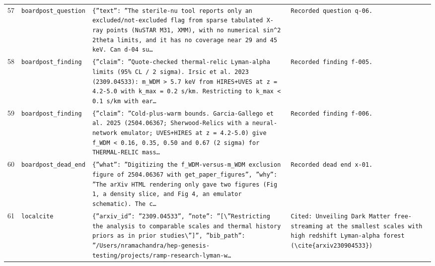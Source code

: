 \documentclass[11pt,a4paper]{article}
\begin{document}
\begin{longtable}{@{}p{}p{}p{}p{}@{}}
57 & \texttt{board}\newline\texttt{post\_\allowbreak{}question} & \texttt{\{''text'':\allowbreak{} ''The sterile-nu tool reports only an excluded/\allowbreak{}not-excluded flag from sparse tabulated X-ray points (NuSTAR M31,\allowbreak{} XMM)\allowbreak{},\allowbreak{} with no numerical sin\textasciicircum{}\allowbreak{}2 2theta limits,\allowbreak{} and it has no coverage near 29 and 45 keV. Can d-04 su\ldots{}\allowbreak{}} & \texttt{Recorded question q-06.} \\
58 & \texttt{board}\newline\texttt{post\_\allowbreak{}finding} & \texttt{\{''claim'':\allowbreak{} ''Quote-checked thermal-relic Lyman-alpha limits (95\% CL /\allowbreak{} 2 sigma)\allowbreak{}. Irsic et al. 2023 (2309.04533)\allowbreak{}:\allowbreak{} m\_\allowbreak{}WDM \textgreater{}\allowbreak{} 5.7 keV from HIRES+UVES at z =\allowbreak{} 4.2-5.0 with k\_\allowbreak{}max =\allowbreak{} 0.2 s/\allowbreak{}km. Restricting to k\_\allowbreak{}max \textless{}\allowbreak{} 0.1 s/\allowbreak{}km with ear\ldots{}\allowbreak{}} & \texttt{Recorded finding f-005.} \\
59 & \texttt{board}\newline\texttt{post\_\allowbreak{}finding} & \texttt{\{''claim'':\allowbreak{} ''Cold-plus-warm bounds. Garcia-Gallego et al. 2025 (2504.06367;\allowbreak{} Sherwood-Relics with a neural-network emulator;\allowbreak{} UVES+HIRES at z =\allowbreak{} 4.2-5.0)\allowbreak{} give f\_\allowbreak{}WDM \textless{}\allowbreak{} 0.16,\allowbreak{} 0.35,\allowbreak{} 0.50 and 0.67 (2 sigma)\allowbreak{} for THERMAL-RELIC mass\ldots{}\allowbreak{}} & \texttt{Recorded finding f-006.} \\
60 & \texttt{board}\newline\texttt{post\_\allowbreak{}dead\_\allowbreak{}end} & \texttt{\{''what'':\allowbreak{} ''Digitizing the f\_\allowbreak{}WDM-versus-m\_\allowbreak{}WDM exclusion figure of 2504.06367 with get\_\allowbreak{}paper\_\allowbreak{}figures'',\allowbreak{} ''why'':\allowbreak{} ''The arXiv HTML rendering only gave two figures (Fig 1,\allowbreak{} a density slice,\allowbreak{} and Fig 4,\allowbreak{} an emulator schematic)\allowbreak{}. The c\ldots{}\allowbreak{}} & \texttt{Recorded dead end x-01.} \\
61 & \texttt{local}\newline\texttt{cite} & \texttt{\{''arxiv\_\allowbreak{}id'':\allowbreak{} ''2309.04533'',\allowbreak{} ''note'':\allowbreak{} ''[\textbackslash{}\allowbreak{}''Restricting the analysis to comparable scales and thermal history priors as in prior studies\textbackslash{}\allowbreak{}'']\allowbreak{}'',\allowbreak{} ''bib\_\allowbreak{}path'':\allowbreak{} ''/\allowbreak{}Users/\allowbreak{}nramachandra/\allowbreak{}hep-genesis-testing/\allowbreak{}projects/\allowbreak{}ramp-research-lyman-w\ldots{}\allowbreak{}} & \texttt{Cited:\allowbreak{} Unveiling Dark Matter free-streaming at the smallest scales with high redshift Lyman-alpha forest (\textbackslash{}\allowbreak{}cite\{arxiv230904533\}\allowbreak{})\allowbreak{}} \\

\end{longtable}
\end{document}
